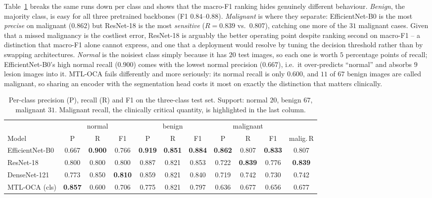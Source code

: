 \documentclass[11pt]{article}
\newcommand{\best}[1]{\textbf{#1}}
\begin{document}
Table~\ref{tab:clsper} breaks the same runs down per class and shows that the
macro-F1 ranking hides genuinely different behaviour. \emph{Benign}, the majority
class, is easy for all three pretrained backbones (F1 $0.84$--$0.88$).
\emph{Malignant} is where they separate: EfficientNet-B0 is the most
\emph{precise} on malignant ($0.862$) but ResNet-18 is the most \emph{sensitive}
($R=0.839$ vs.\ $0.807$), catching one more of the $31$ malignant cases. Given
that a missed malignancy is the costliest error, ResNet-18 is arguably the better
operating point despite ranking second on macro-F1 -- a distinction that macro-F1
alone cannot express, and one that a deployment would resolve by tuning the
decision threshold rather than by swapping architectures.
\emph{Normal} is the noisiest class simply because it has $20$ test images, so each
one is worth $5$ percentage points of recall; EfficientNet-B0's high normal recall
($0.900$) comes with the lowest normal precision ($0.667$), i.e.\ it over-predicts
``normal'' and absorbs $9$ lesion images into it. MTL-OCA fails differently and
more seriously: its normal recall is only $0.600$, and $11$ of $67$ benign images
are called malignant, so sharing an encoder with the segmentation head costs it
most on exactly the distinction that matters clinically.

\begin{table}[t]
\centering
\caption{Per-class precision (P), recall (R) and F1 on the three-class test set.
Support: normal $20$, benign $67$, malignant $31$. Malignant recall, the
clinically critical quantity, is highlighted in the last column.}
\label{tab:clsper}
\small
\begin{tabular}{@{}l ccc ccc ccc c@{}}
\toprule
& \multicolumn{3}{c}{normal} & \multicolumn{3}{c}{benign} & \multicolumn{3}{c}{malignant} & \\
\cmidrule(lr){2-4}\cmidrule(lr){5-7}\cmidrule(lr){8-10}
Model & P & R & F1 & P & R & F1 & P & R & F1 & malig.\,R \\
\midrule
EfficientNet-B0 & 0.667 & \best{0.900} & 0.766 & \best{0.919} & \best{0.851} & \best{0.884} & \best{0.862} & 0.807 & \best{0.833} & 0.807 \\
ResNet-18       & 0.800 & 0.800 & 0.800 & 0.887 & 0.821 & 0.853 & 0.722 & \best{0.839} & 0.776 & \best{0.839} \\
DenseNet-121    & 0.773 & 0.850 & \best{0.810} & 0.859 & 0.821 & 0.840 & 0.719 & 0.742 & 0.730 & 0.742 \\
MTL-OCA (cls)   & \best{0.857} & 0.600 & 0.706 & 0.775 & 0.821 & 0.797 & 0.636 & 0.677 & 0.656 & 0.677 \\
\bottomrule
\end{tabular}
\end{table}
\end{document}
